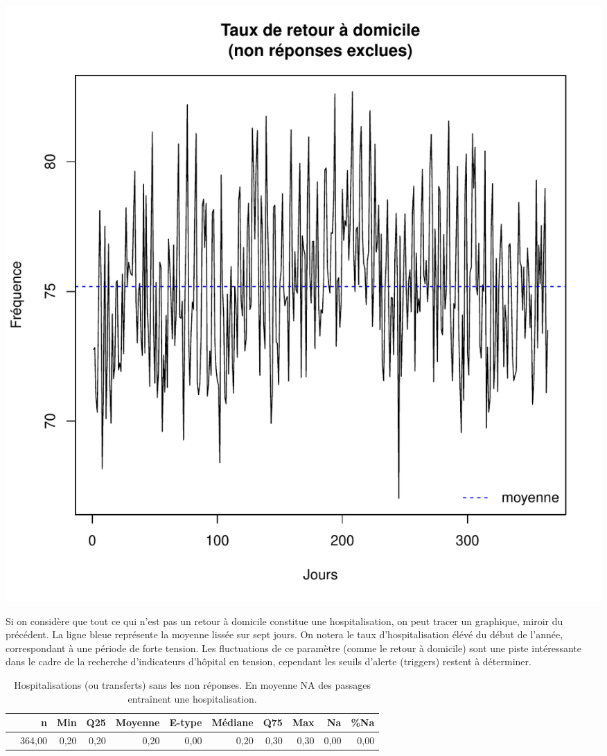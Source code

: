 \documentclass[12pt,english,french,twoside]{book}\usepackage[]{graphicx}\usepackage[]{color}
\makeatletter
\def\maxwidth{ %
  \ifdim\Gin@nat@width>\linewidth
    \linewidth
  \else
    \Gin@nat@width
  \fi
}
\makeatother
\begin{document}
\includegraphics[width=\maxwidth]{figure/retour_dom2-1} 


Si on considère que tout ce qui n'est pas un retour à domicile constitue une hospitalisation, on peut tracer un graphique, miroir du précédent. La ligne bleue représente la moyenne lissée sur sept jours. On notera le taux d'hospitalisation élévé du début de l'année, correspondant à une période de forte tension. Les fluctuations de ce paramètre (comme le retour à domicile) sont une piste intéressante dans le cadre de la recherche d'indicateurs d'hôpital en tension, cependant les seuils d'alerte (triggers) restent à déterminer.

\begin{table}[ht]
\centering
\begin{tabular}{rrrrrrrrrrr}
  \hline
 & n & Min & Q25 & Moyenne & E-type & Médiane & Q75 & Max & Na & \%Na \\ 
  \hline
 & 364,00 & 0,20 & 0,20 & 0,20 & 0,00 & 0,20 & 0,30 & 0,30 & 0,00 & 0,00 \\ 
   \hline
\end{tabular}
\caption[Hospitalisations]{Hospitalisations (ou transferts) sans les non réponses. En moyenne NA des passages entraînent une hospitalisation.} 
\label{tab:hosp}
\end{table}
\end{document}
